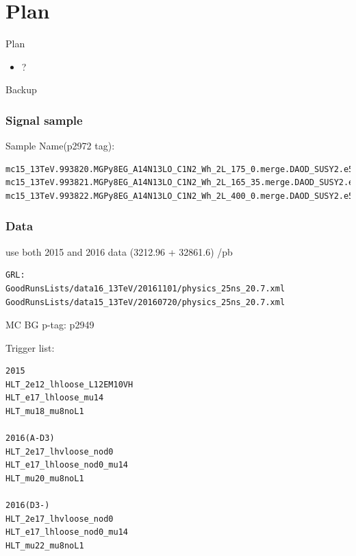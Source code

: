 \documentclass[mathserif,serif]{beamer}
\begin{document}
\section{Plan}
\begin{frame}{Plan}
\begin{itemize}
\item ?
\end{itemize}
\end{frame}

\begin{frame}
\begin{center}
\huge
Backup
\end{center}
\end{frame}

\begin{frame}[fragile]
\frametitle{Signal sample}
\small
Sample Name(p2972 tag):
\tiny
\begin{verbatim}
mc15_13TeV.993820.MGPy8EG_A14N13LO_C1N2_Wh_2L_175_0.merge.DAOD_SUSY2.e5678_a766_a821_r7676_p2949_p2972
mc15_13TeV.993821.MGPy8EG_A14N13LO_C1N2_Wh_2L_165_35.merge.DAOD_SUSY2.e5678_a766_a821_r7676_p2949_p2972
mc15_13TeV.993822.MGPy8EG_A14N13LO_C1N2_Wh_2L_400_0.merge.DAOD_SUSY2.e5678_a766_a821_r7676_p2949_p2972
\end{verbatim}
\end{frame}

\begin{frame}[fragile]
\frametitle{Data}
\small
use both 2015 and 2016 data (3212.96 + 32861.6) /pb
\tiny
\begin{verbatim}
GRL:
GoodRunsLists/data16_13TeV/20161101/physics_25ns_20.7.xml
GoodRunsLists/data15_13TeV/20160720/physics_25ns_20.7.xml
\end{verbatim}
\end{frame}

\begin{frame}{MC BG}
p-tag: p2949
\end{frame}

\begin{frame}[fragile]
\small
Trigger list:\\
\scriptsize
\begin{verbatim}
2015
HLT_2e12_lhloose_L12EM10VH
HLT_e17_lhloose_mu14
HLT_mu18_mu8noL1

2016(A-D3)
HLT_2e17_lhvloose_nod0
HLT_e17_lhloose_nod0_mu14
HLT_mu20_mu8noL1

2016(D3-)
HLT_2e17_lhvloose_nod0
HLT_e17_lhloose_nod0_mu14
HLT_mu22_mu8noL1
\end{verbatim}
\end{frame}
\end{document}
